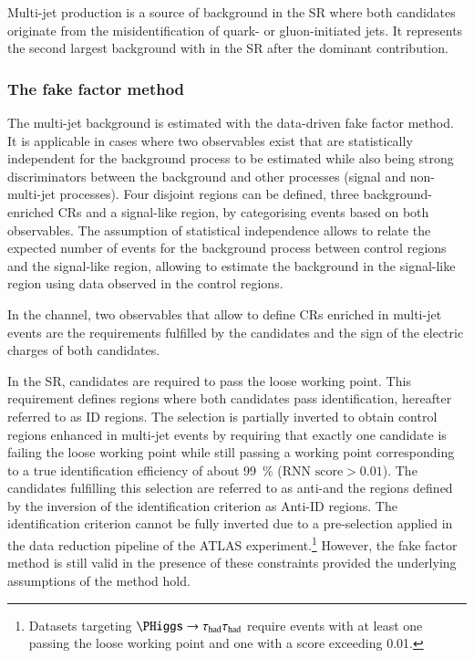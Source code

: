 \label{sec:hadhad_multijet}


Multi-jet production is a source of background in the \hadhad SR where both
\tauhadvis candidates originate from the misidentification of quark- or
gluon-initiated jets. It represents the second largest background with
\faketauhadvis in the \hadhad SR after the dominant \ttbarFakes contribution.

\subsubsection{The fake factor method}

The multi-jet background is estimated with the data-driven fake factor
method. It is applicable in cases where two observables exist that are
statistically independent for the background process to be estimated while also
being strong discriminators between the background and other processes (signal
and non-multi-jet processes). Four disjoint regions can be defined, three
background-enriched CRs and a signal-like region, by categorising events based
on both observables. The assumption of statistical independence allows to relate
the expected number of events for the background process between control regions
and the signal-like region, allowing to estimate the background in the
signal-like region using data observed in the control regions.

In the \hadhad channel, two observables that allow to define CRs enriched in
multi-jet events are the \tauid requirements fulfilled by the \tauhadvis
candidates and the sign of the electric charges of both candidates.

In the SR, \tauhadvis candidates are required to pass the loose \tauid working
point. This requirement defines regions where both \tauhadvis candidates pass
identification, hereafter referred to as ID regions. The selection is partially
inverted to obtain control regions enhanced in multi-jet events by requiring
that exactly one \tauhadvis candidate is failing the loose \tauid working point
while still passing a working point corresponding to a true \tauhadvis
identification efficiency of about \SI{99}{\percent}
($\text{RNN score} > 0.01$). The \tauhadvis candidates fulfilling this selection
are referred to as anti-\tauhadvis and the regions defined by the inversion of
the identification criterion as Anti-ID regions. The identification criterion
cannot be fully inverted due to a pre-selection applied in the data reduction
pipeline of the ATLAS experiment.\footnote{Datasets targeting
  $\PHiggs \to \hadhad$ require events with at least one \tauhadvis passing the
  loose \tauid working point and one \tauhadvis with a \tauid score exceeding
  0.01.}  However, the fake factor method is still valid in the presence of
these constraints provided the underlying assumptions of the method hold.

